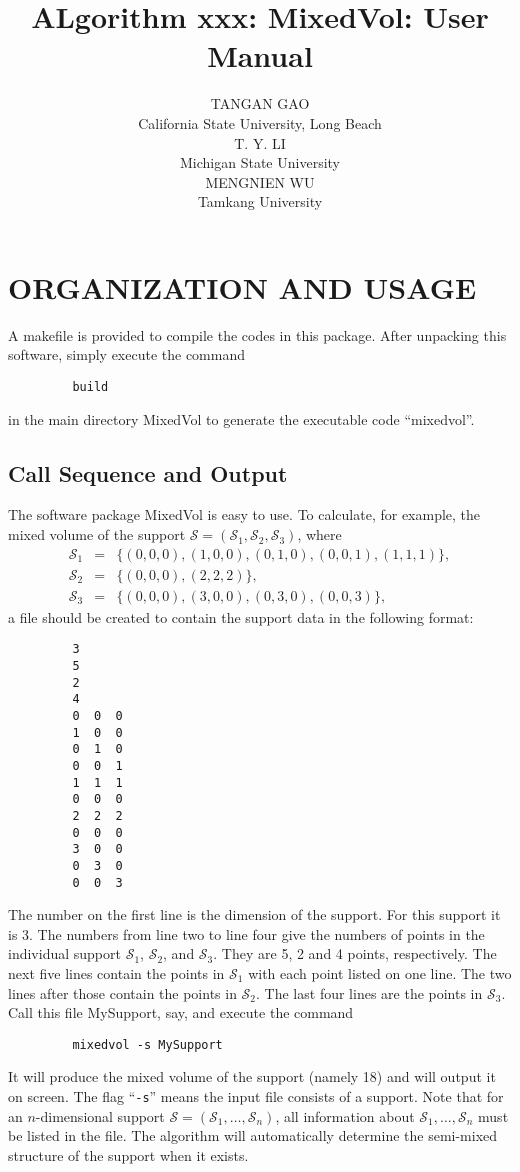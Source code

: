 \documentclass[acmtocl]{acmtrans2m}
\title{ALgorithm xxx: MixedVol: User Manual}
\author{ TANGAN GAO \\  California State University, Long Beach \\
         T. Y. LI \\ Michigan State University \\
         MENGNIEN WU \\ Tamkang University}
\newcommand{\calA}{{\mathcal S}}
\begin{document}
\section{ORGANIZATION AND USAGE}


A makefile is provided to compile the codes in this package. After unpacking
this software,
simply execute
the command
\begin{verbatim}
         build
\end{verbatim}
in the main directory MixedVol
to generate the executable code ``mixedvol''.

\subsection{Call Sequence and Output}

The software package MixedVol is easy to use.
To calculate, for example, the mixed volume
of the support $\calA=(\calA_1,\calA_2,\calA_3)$, where
\begin{eqnarray*}
\calA_1&=&\{
        (0,0,0), (1,0,0),(0,1,0),(0,0,1),(1,1,1)
        \}, \\
\calA_2&=&\{
        (0,0,0), (2,2,2)
        \}, \\
\calA_3&=&\{
        (0,0,0), (3,0,0),(0,3,0),(0,0,3)
        \},
\end{eqnarray*}
a file should be created to contain the support data
in the following format:
\begin{verbatim}
         3
         5
         2
         4
         0  0  0
         1  0  0
         0  1  0
         0  0  1
         1  1  1
         0  0  0
         2  2  2
         0  0  0
         3  0  0
         0  3  0
         0  0  3
\end{verbatim}
The number on the first line is the dimension of the support. For this support it is 3.
The numbers from line two to line four give the numbers of points in the
individual support
$\calA_1$, $\calA_2$, and $\calA_3$.
They are 5, 2 and 4 points, respectively.
The next five lines contain the points in $\calA_1$ with each point listed on one line.
The two lines after those contain the points in $\calA_2$. The last four lines
are the points in $\calA_3$.
Call this file MySupport, say,  and
execute the command
\begin{verbatim}
         mixedvol -s MySupport
\end{verbatim}
It will produce the mixed volume of the support (namely 18) and will output it on screen.
The flag ``{\tt -s}'' means the input file
consists of a support.
Note that for an $n$-dimensional support $\calA=(\calA_1,\dots,\calA_n)$, all information about
$\calA_1,\dots,\calA_n$ must be listed in the file.
The algorithm will automatically determine the semi-mixed structure of the support
when it exists.
\end{document}
